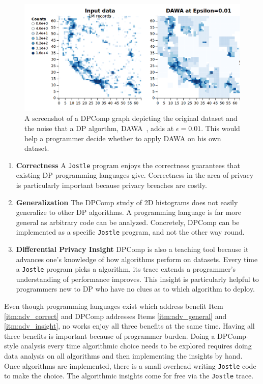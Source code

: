 \documentclass[11pt]{report}
\newcommand{\Jostle}{\texttt{Jostle}}
\begin{document}
\begin{figure}
\begin{center}
\includegraphics[scale=0.3]{DPComp}
\end{center}
\caption{A screenshot of a DPComp graph depicting the original dataset and the noise that a DP algorthm, DAWA~\cite{Li:2014}, adds at $\epsilon=0.01$. This would help a programmer decide whether to apply DAWA on his own dataset.}\label{fig:dpcomp}
\end{figure}
\begin{enumerate}
\item \textbf{Correctness} A \Jostle{} program enjoys the correctness guarantees that existing DP programming languages give. Correctness in the area of privacy is particularly important because privacy breaches are costly.
\label{itm:adv_correct}
\item \textbf{Generalization} The DPComp study of 2D histograms does not easily generalize to other DP algorithms. A programming language is far more general as arbitrary code can be analyzed. Concretely, DPComp can be implemented as a specific \Jostle{} program, and not the other way round.
\label{itm:adv_general}
\item \textbf{Differential Privacy Insight} DPComp is also a teaching tool because it advances one's knowledge of how algorithms perform on datasets. Every time a \Jostle{} program picks a algorithm, its trace extends a programmer's understanding of performance improves. This insight is particularly helpful to programmers new to DP who have no clues as to which algorithm to deploy.
\label{itm:adv_insight}
\end{enumerate}

Even though programming languages exist which address benefit Item \ref{itm:adv_correct} and DPComp addresses Items \ref{itm:adv_general} and \ref{itm:adv_insight}, no works enjoy all three benefits at the same time. Having all three benefits is important because of programmer burden. Doing a DPComp-style analysis every time algorithmic choice needs to be explored requires doing data analysis on all algorithms and then implementing the insights by hand. Once algorithms are implemented, there is a small overhead writing \Jostle{} code to make the choice. The algorithmic insights come for free via the \Jostle{} trace.
\end{document}
